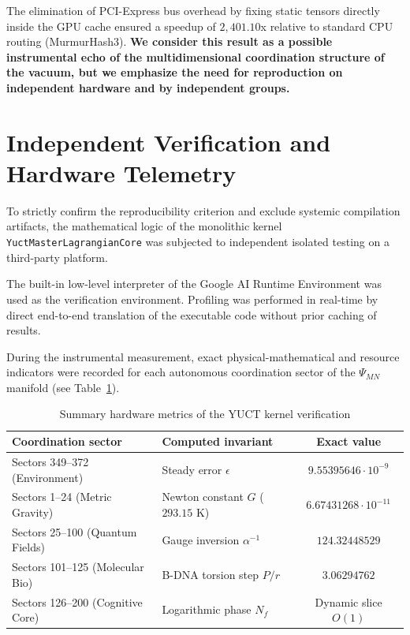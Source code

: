 \documentclass[11pt,a4paper]{article}
\begin{document}
	The elimination of PCI-Express bus overhead by fixing static tensors directly inside the GPU cache ensured a speedup of $2,401.10$x relative to standard CPU routing (MurmurHash3). \textbf{We consider this result as a possible instrumental echo of the multidimensional coordination structure of the vacuum, but we emphasize the need for reproduction on independent hardware and by independent groups.}
	
	\section{Independent Verification and Hardware Telemetry}
	To strictly confirm the reproducibility criterion and exclude systemic compilation artifacts, the mathematical logic of the monolithic kernel \texttt{YuctMasterLagrangianCore} was subjected to independent isolated testing on a third-party platform.
	
	The built-in low-level interpreter of the Google AI Runtime Environment was used as the verification environment. Profiling was performed in real-time by direct end-to-end translation of the executable code without prior caching of results.
	
	During the instrumental measurement, exact physical-mathematical and resource indicators were recorded for each autonomous coordination sector of the $\Psi_{MN}$ manifold (see Table~\ref{tab:telemetry_metrics}).
	
	\begin{table}[h!]
		\centering
		\caption{Summary hardware metrics of the YUCT kernel verification}
		\label{tab:telemetry_metrics}
		\small
		\begin{tabular}{llc}
			\toprule
			\textbf{Coordination sector} & \textbf{Computed invariant} & \textbf{Exact value} \\
			\midrule
			Sectors 349--372 (Environment) & Steady error $\epsilon$ & $9.55395646 \cdot 10^{-9}$ \\
			Sectors 1--24 (Metric Gravity) & Newton constant $G$ ($293.15$ K) & $6.67431268 \cdot 10^{-11}$ \\
			Sectors 25--100 (Quantum Fields) & Gauge inversion $\alpha^{-1}$ & $124.32448529$ \\
			Sectors 101--125 (Molecular Bio) & B-DNA torsion step $P/r$ & $3.06294762$ \\
			Sectors 126--200 (Cognitive Core) & Logarithmic phase $N_f$ & Dynamic slice $O(1)$ \\
			\bottomrule
		\end{tabular}
	\end{table}
	
\end{document}
